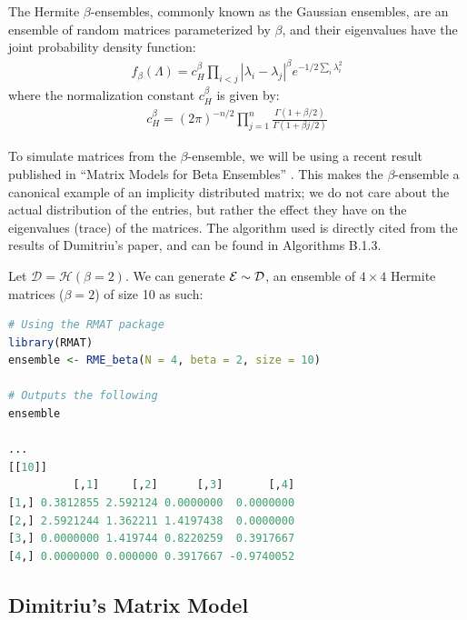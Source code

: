 \begin{definition}
The Hermite $\beta$-ensembles, commonly known as the Gaussian ensembles, are an ensemble of random matrices parameterized by $\beta$, and their eigenvalues have the joint probability density function:
\begin{align*}
f_\beta(\Lambda) = c_H^\beta \prod_{i < j} |\lambda_i - \lambda_j|^\beta e^{-1/2\sum_i \lambda_i^2}
\end{align*}
where the normalization constant $c_H^\beta$ is given by:
\begin{align*}
c_H^\beta = (2\pi)^{-n/2} \prod_{j = 1}^n \frac{\Gamma(1 + \beta/2)}{\Gamma(1 + \beta j/2)}
\end{align*}
\end{definition}

To simulate matrices from the $\beta$-ensemble, we will be using a recent result published in ``Matrix Models for Beta Ensembles'' \cite{dimitriu:2018}. This makes the $\beta$-ensemble a canonical example of an implicity distributed matrix; we do not care about the actual distribution of the entries, but rather the effect they have on the eigenvalues (trace) of the matrices. The algorithm used is directly cited from the results of Dumitriu's paper, and can be found in Algorithms B.1.3.

\begin{code}[Hermite Beta = 2 Ensemble]
Let $\mathcal{D} = \mathcal{H}(\beta = 2)$. We can generate $\mathcal{E} \sim \mathcal{D}$, an ensemble of $4 \times 4$ Hermite matrices ($\beta = 2$) of size 10 as such:
\end{code}

\begin{lstlisting}[language=R]
# Using the RMAT package
library(RMAT)
ensemble <- RME_beta(N = 4, beta = 2, size = 10)

# Outputs the following
ensemble

...
[[10]]
          [,1]     [,2]      [,3]       [,4]
[1,] 0.3812855 2.592124 0.0000000  0.0000000
[2,] 2.5921244 1.362211 1.4197438  0.0000000
[3,] 0.0000000 1.419744 0.8220259  0.3917667
[4,] 0.0000000 0.000000 0.3917667 -0.9740052
\end{lstlisting}


\subsection{Dimitriu's Matrix Model}

